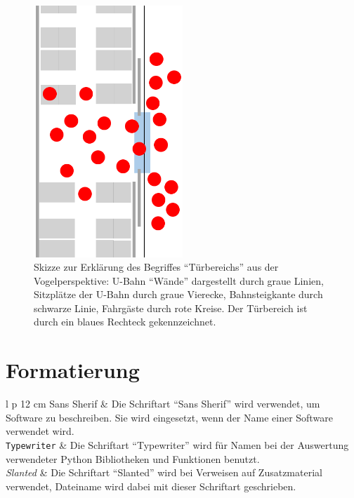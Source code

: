  \begin{figure}[H]
	\centering
		\includegraphics[angle=270, width=0.5\textwidth]{pictures/introduction/defenitions/example_doorarea.png}
	\caption{Skizze zur Erklärung des Begriffes "`Türbereichs"' aus der Vogelperspektive: U-Bahn "`Wände"' dargestellt durch graue Linien, Sitzplätze der U-Bahn durch graue Vierecke, Bahnsteigkante durch schwarze Linie, Fahrgäste durch rote Kreise. Der Türbereich ist durch ein blaues Rechteck gekennzeichnet.}
	\label{fig:Doorarea}
\end{figure} 
\section{Formatierung}
\begin{table}[H]
	\centering
		\begin{tabular}{ l p {12 cm}}
		\textsf{Sans Sherif}	& Die Schriftart "`Sans Sherif"' wird verwendet, um Software zu beschreiben. Sie wird eingesetzt, wenn der Name einer Software verwendet wird.\\
		\texttt{Typewriter}	& Die Schriftart "`Typewriter"' wird für Namen bei der Auswertung verwendeter Python Bibliotheken und Funktionen benutzt. \\
		\textsl{Slanted}	& Die Schriftart "`Slanted"' wird bei Verweisen auf Zusatzmaterial verwendet, Dateiname wird dabei mit dieser Schriftart geschrieben.
		\end{tabular}
\end{table}